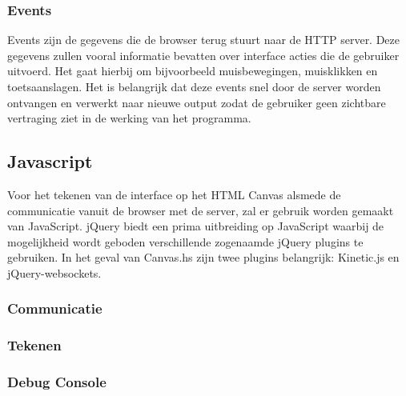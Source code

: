 \documentclass[a4paper]{report}
\begin{document}
\subsubsection{Events}
Events zijn de gegevens die de browser terug stuurt naar de HTTP server. Deze gegevens zullen vooral informatie bevatten over interface acties die de gebruiker uitvoerd. Het gaat hierbij om bijvoorbeeld muisbewegingen, muisklikken en toetsaanslagen. Het is belangrijk dat deze events snel door de server worden ontvangen en verwerkt naar nieuwe output zodat de gebruiker geen zichtbare vertraging ziet in de werking van het programma.

\subsection{Javascript}
Voor het tekenen van de interface op het HTML Canvas alsmede de communicatie vanuit de browser met de server, zal er gebruik worden gemaakt van JavaScript. jQuery biedt een prima uitbreiding op JavaScript waarbij de mogelijkheid wordt geboden verschillende zogenaamde jQuery plugins te gebruiken. In het geval van Canvas.hs zijn twee plugins belangrijk: Kinetic.js en jQuery-websockets.
\subsubsection{Communicatie}
\subsubsection{Tekenen}

\subsubsection{Debug Console}


\newpage


\end{document}
